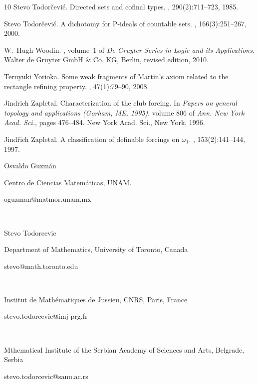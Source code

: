 \documentclass{article}
\begin{document}
\begin{thebibliography}{10}
Stevo Todor\v{c}evi\'{c}.
\newblock Directed sets and cofinal types.
, 290(2):711--723, 1985.

Stevo Todor\v{c}evi\'{c}.
\newblock A dichotomy for {P}-ideals of countable sets.
, 166(3):251--267, 2000.

W.~Hugh Woodin.
, volume~1 of {\em De Gruyter Series in Logic and its Applications}.
\newblock Walter de Gruyter GmbH \& Co. KG, Berlin, revised edition, 2010.

Teruyuki Yorioka.
\newblock Some weak fragments of {M}artin's axiom related to the rectangle
  refining property.
, 47(1):79--90, 2008.

Jindrich Zapletal.
\newblock Characterization of the club forcing.
\newblock In {\em Papers on general topology and applications ({G}orham, {ME},
  1995)}, volume 806 of {\em Ann. New York Acad. Sci.}, pages 476--484. New
  York Acad. Sci., New York, 1996.

Jind\v{r}ich Zapletal.
\newblock A classification of definable forcings on {$\omega_1$}.
, 153(2):141--144, 1997.

\end{thebibliography}



Osvaldo Guzm\'{a}n

Centro de Ciencias Matem\'{a}ticas, UNAM.

oguzman@matmor.unam.mx

\qquad\qquad\qquad\ \ 

Stevo Todorcevic

Department of Mathematics, University of Toronto, Canada

stevo@math.toronto.edu

\qquad\ \qquad\ \ \ \qquad\ \ \ 

Institut de Math\'{e}matiques de Jussieu, CNRS, Paris, France

stevo.todorcevic@imj-prg.fr

\qquad\qquad\ \qquad\ \ \ 

Mthematical Institute of the Serbian Academy of Sciences and Arts, Belgrade, Serbia

stevo.todorcevic@sanu.ac.rs
\end{document}
